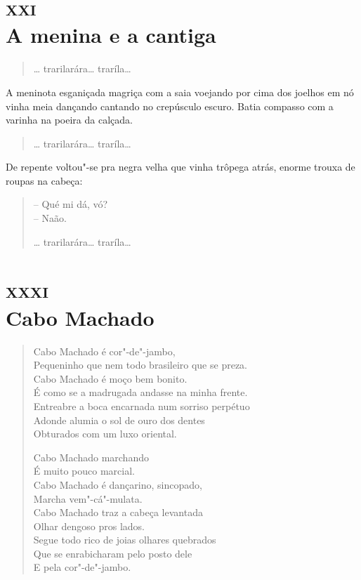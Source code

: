 {\chapter[A menina e a cantiga]{\textsc{xxi}\\A menina e a cantiga}


\begin{verse}
\ldots{} trarilarára\ldots{} traríla\ldots{}
\end{verse}

\parbox{\textwidth}{
A meninota esganiçada magriça com a saia voejando
por cima dos joelhos em nó vinha meia dançando cantando no crepúsculo escuro. Batia compasso com a varinha na poeira da calçada.}

\begin{verse}
\ldots{} trarilarára\ldots{} traríla\ldots{}
\end{verse}

\parbox{\textwidth}{
De repente voltou"-se pra negra velha que vinha trôpega atrás, enorme trouxa de roupas na cabeça:}

\begin{verse}
-- Qué mi dá, vó?\\
-- Naão.

\ldots{} trarilarára\ldots{} traríla\ldots{}
\end{verse}

\chapter[Cabo Machado]{\textsc{xxxi}\\Cabo Machado}

\begin{verse}
Cabo Machado é cor"-de"-jambo,\\
Pequeninho que nem todo brasileiro que se preza.\\
Cabo Machado é moço bem bonito.\\
É como se a madrugada andasse na minha frente.\\
Entreabre a boca encarnada num sorriso perpétuo\\
Adonde alumia o sol de ouro dos dentes\\
Obturados com um luxo oriental.

Cabo Machado marchando\\
É muito pouco marcial.\\
Cabo Machado é dançarino, sincopado,\\
Marcha vem"-cá"-mulata.\\
Cabo Machado traz a cabeça levantada\\
Olhar dengoso pros lados.\\
Segue todo rico de joias olhares quebrados\\
Que se enrabicharam pelo posto dele\\
E pela cor"-de"-jambo.


\end{verse}}
